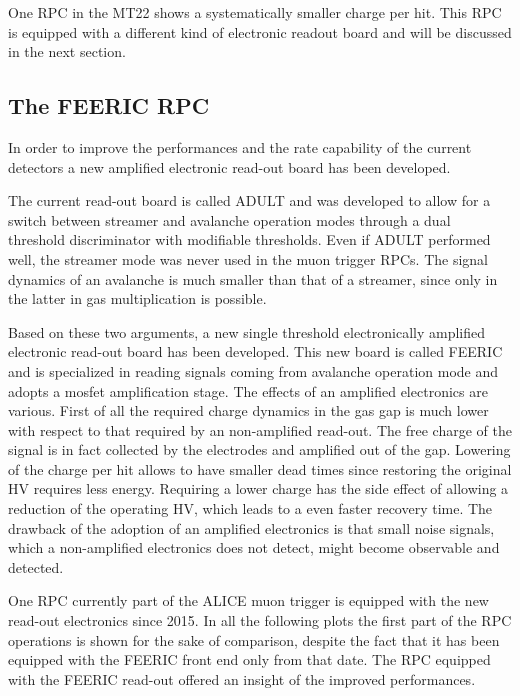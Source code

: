 One RPC in the MT22 shows a systematically smaller charge per hit.
This RPC is equipped with a different kind of electronic readout board and will be discussed in the next section.

\subsection{The FEERIC RPC}
In order to improve the performances and the rate capability of the current detectors a new amplified electronic read-out board has been developed.

The current read-out board is called ADULT and was developed to allow for a switch between streamer and avalanche operation modes through a dual threshold discriminator with modifiable thresholds.
Even if ADULT performed well, the streamer mode was never used in the muon trigger RPCs.
The signal dynamics of an avalanche is much smaller than that of a streamer, since only in the latter in gas multiplication is possible.

Based on these two arguments, a new single threshold electronically amplified electronic read-out board has been developed.
This new board is called FEERIC and is specialized in reading signals coming from avalanche operation mode and adopts a mosfet amplification stage.
The effects of an amplified electronics are various.
First of all the required charge dynamics in the gas gap is much lower with respect to that required by an non-amplified read-out.
The free charge of the signal is in fact collected by the electrodes and amplified out of the gap.
Lowering of the charge per hit allows to have smaller dead times since restoring the original HV requires less energy.
Requiring a lower charge has the side effect of allowing a reduction of the operating HV, which leads to a even faster recovery time.
The drawback of the adoption of an amplified electronics is that small noise signals, which a non-amplified electronics does not detect, might become observable and detected.

One RPC currently part of the ALICE muon trigger is equipped with the new read-out electronics since 2015.
In all the following plots the first part of the RPC operations is shown for the sake of comparison, despite the fact that it has been equipped with the FEERIC front end only from that date.
The RPC equipped with the FEERIC read-out offered an insight of the improved performances.

